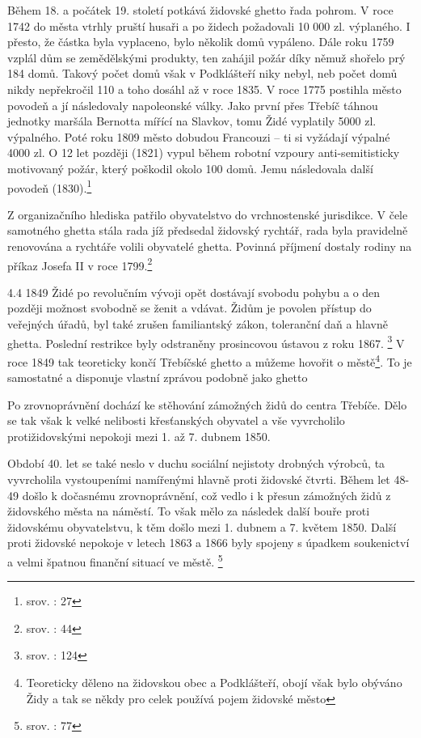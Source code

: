 \documentclass[a4paper,oneside,12p]{report}
\begin{document}
Během 18. a počátek 19. století potkává židovské ghetto řada pohrom.
V roce 1742 do města vtrhly pruští husaři a po židech požadovali 10 000 zl. výplaného.
I přesto, že částka byla vyplaceno, bylo několik domů vypáleno.
Dále roku 1759 vzplál dům se zemědělskými produkty, ten zahájil požár díky němuž shořelo prý 184 domů.
Takový počet domů však v Podklášteří niky nebyl, neb počet domů nikdy nepřekročil 110 a toho dosáhl až v roce 1835.
V roce 1775 postihla město povodeň a jí následovaly napoleonské války.
Jako první přes Třebíč táhnou jednotky maršála Bernotta mířící na Slavkov, tomu Židé vyplatily 5000 zl. výpalného.
Poté roku 1809 město dobudou Francouzi -- ti si vyžádají výpalné 4000 zl.
O 12 let později (1821) vypul během robotní vzpoury anti-semitisticky motivovaný požár, který poškodil okolo 100 domů.
Jemu následovala další povodeň (1830).\footnote{srov. \cite{Fiser2005}: 27}

Z organizačního hlediska patřilo obyvatelstvo do vrchnostenské jurisdikce.
V čele samotného ghetta stála rada jíž předsedal židovský rychtář, rada byla pravidelně renovována a rychtáře volili obyvatelé ghetta.
Povinná příjmení dostaly rodiny na příkaz Josefa II v roce 1799.\footnote{srov. \cite{Uhlir1978}: 44}

4.4 1849 Židé po revolučním vývoji opět dostávají svobodu pohybu a o den později možnost svobodně se ženit a vdávat.
Židům je povolen přístup do veřejných úřadů, byl také zrušen familiantský zákon, toleranční daň a hlavně ghetta.
Poslední restrikce byly odstraněny prosincovou ústavou z roku 1867. \footnote{srov. \cite{Pekny2001}: 124}
V roce 1849 tak teoreticky končí Třebíčské ghetto a můžeme hovořit o městě\footnote{Teoreticky děleno na židovskou obec a Podklášteří, obojí však bylo obýváno Židy a tak se někdy pro celek používá pojem židovské město}.
To je samostatné a disponuje vlastní zprávou podobně jako ghetto

Po zrovnoprávnění dochází ke stěhování zámožných židů do centra Třebíče.
Dělo se tak však k velké nelibosti křesťanských obyvatel a vše vyvrcholilo protižidovskými nepokoji mezi 1. až 7. dubnem  1850.

Období 40. let se také neslo v duchu sociální nejistoty drobných výrobců, ta vyvrcholila vystoupeními namířenými hlavně proti židovské čtvrti.
Během let 48-49 došlo k dočasnému zrovnoprávnění, což vedlo i k přesun zámožných židů z židovského města na náměstí.
To však mělo za následek další bouře proti židovskému obyvatelstvu, k těm došlo mezi 1. dubnem a 7. květem 1850.
Další proti židovské nepokoje v letech 1863 a 1866 byly spojeny s úpadkem soukenictví a velmi špatnou finanční situací ve městě. \footnote{srov. \cite{Janak1981}: 77}
\end{document}
